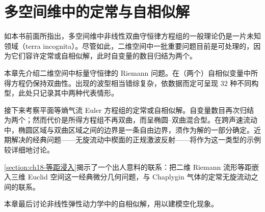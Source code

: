 \documentclass[../main.tex]{subfiles}
\begin{document}
\chapter{多空间维中的定常与自相似解}\label{chapter:ch18-多维定常与自相似解}

如本书前面所指出，多空间维中非线性双曲守恒律方程组的一般理论仍是一片未知领域（terra incognita）。尽管如此，二维空间中一批重要问题目前是可处理的，因为它们容许定常或自相似解，此时自变量的数目归结为两个。

本章先介绍二维空间中标量守恒律的 Riemann 问题。在（两个）自相似变量中所得方程仍保持双曲性。出现的波型相当错综复杂，依数据而定可呈现 $32$ 种不同构型，此处只记录其中两种代表情形。

接下来考察平面等熵气流 Euler 方程组的定常或自相似解。自变量数目再次归结为两个；然而代价是所得方程组不再双曲，而呈椭圆--双曲混合型。在跨声速流动中，椭圆区域与双曲区域之间的边界是一条自由边界，须作为解的一部分确定。近期解决的经典问题——无旋流动中楔面的正规激波反射——将作为这一类型的示例较详细地讨论。

\cref{section:ch18-等距浸入}揭示了一个出人意料的联系：把二维 Riemann 流形等距嵌入三维 Euclid 空间这一经典微分几何问题，与 Chaplygin 气体的定常无旋流动之间的联系。

本章最后讨论非线性弹性动力学中的自相似解，用以建模空化现象。










\end{document}
